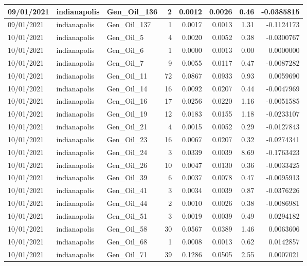\documentclass[
  letterpaper,
  DIV=11,
  numbers=noendperiod]{scrartcl}
\begin{document}
\begin{tabular}{l|l|l|r|r|r|r|r}
\hline
09/01/2021 & indianapolis & Gen\_Oil\_136 & 2 & 0.0012 & 0.0026 & 0.46 & -0.0385815\\
\hline
09/01/2021 & indianapolis & Gen\_Oil\_137 & 1 & 0.0017 & 0.0013 & 1.31 & -0.1124173\\
\hline
10/01/2021 & indianapolis & Gen\_Oil\_5 & 4 & 0.0020 & 0.0052 & 0.38 & -0.0300767\\
\hline
10/01/2021 & indianapolis & Gen\_Oil\_6 & 1 & 0.0000 & 0.0013 & 0.00 & 0.0000000\\
\hline
10/01/2021 & indianapolis & Gen\_Oil\_7 & 9 & 0.0055 & 0.0117 & 0.47 & -0.0087282\\
\hline
10/01/2021 & indianapolis & Gen\_Oil\_11 & 72 & 0.0867 & 0.0933 & 0.93 & 0.0059690\\
\hline
10/01/2021 & indianapolis & Gen\_Oil\_14 & 16 & 0.0092 & 0.0207 & 0.44 & -0.0047969\\
\hline
10/01/2021 & indianapolis & Gen\_Oil\_16 & 17 & 0.0256 & 0.0220 & 1.16 & -0.0051585\\
\hline
10/01/2021 & indianapolis & Gen\_Oil\_19 & 12 & 0.0183 & 0.0155 & 1.18 & -0.0233107\\
\hline
10/01/2021 & indianapolis & Gen\_Oil\_21 & 4 & 0.0015 & 0.0052 & 0.29 & -0.0127843\\
\hline
10/01/2021 & indianapolis & Gen\_Oil\_23 & 16 & 0.0067 & 0.0207 & 0.32 & -0.0274341\\
\hline
10/01/2021 & indianapolis & Gen\_Oil\_24 & 3 & 0.0339 & 0.0039 & 8.69 & -0.1763423\\
\hline
10/01/2021 & indianapolis & Gen\_Oil\_26 & 10 & 0.0047 & 0.0130 & 0.36 & -0.0033425\\
\hline
10/01/2021 & indianapolis & Gen\_Oil\_39 & 6 & 0.0037 & 0.0078 & 0.47 & -0.0095913\\
\hline
10/01/2021 & indianapolis & Gen\_Oil\_41 & 3 & 0.0034 & 0.0039 & 0.87 & -0.0376226\\
\hline
10/01/2021 & indianapolis & Gen\_Oil\_44 & 2 & 0.0010 & 0.0026 & 0.38 & -0.0086981\\
\hline
10/01/2021 & indianapolis & Gen\_Oil\_51 & 3 & 0.0019 & 0.0039 & 0.49 & 0.0294182\\
\hline
10/01/2021 & indianapolis & Gen\_Oil\_58 & 30 & 0.0567 & 0.0389 & 1.46 & 0.0063606\\
\hline
10/01/2021 & indianapolis & Gen\_Oil\_68 & 1 & 0.0008 & 0.0013 & 0.62 & 0.0142857\\
\hline
10/01/2021 & indianapolis & Gen\_Oil\_71 & 39 & 0.1286 & 0.0505 & 2.55 & 0.0007021\\

\end{tabular}
\end{document}
